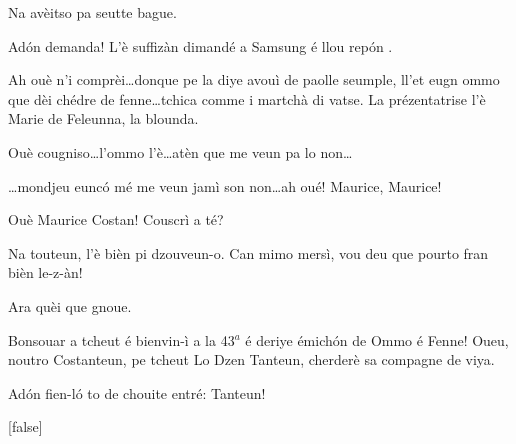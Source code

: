 \begin{drama}
\Vioujspeaks{} Na avèitso pa seutte bague.

\Vioupspeaks Ad\'on demanda! L'è suffizàn dimandé a Samsung é llou rep\'on .


\Vioupspeaks Ah ouè n'i comprèi\ldots donque pe la diye avouì de paolle seum\-ple, ll'et eugn ommo que dèi chédre de fenne\ldots tchica comme i mar\-tchà di vatse. La prézentatrise l'è Marie de Feleunna, la blounda.

\Vioujspeaks Ouè cougniso\ldots l'ommo l'è\ldots atèn que me veun pa lo non\ldots

\Vioupspeaks \ldots mondjeu eunc\'o mé me veun jamì son non\ldots ah oué! Maurice, Maurice!

\Vioujspeaks Ouè Maurice Costan! Couscrì a té?

\Vioupspeaks Na touteun, l'è bièn pi dzouveun-o. Can mimo mersì, vou deu que pourto fran bièn le-z-àn!

\Vioujspeaks Ara quèi que gnoue.








\Mariespeaks Bonsouar a tcheut é bienvin-ì a la 43$^a$ é deriye émich\'on de \og Ommo é Fenne\fg! Oueu, noutro Costanteun, pe tcheut \og Lo Dzen Tanteun\fg, cherderè sa compagne de viya.

\newpage
\Mariespeaks  Ad\'on fien-l\'o to de chouite entré: Tanteun!

[false]%
\vspace*{-6pt}



\end{drama}
